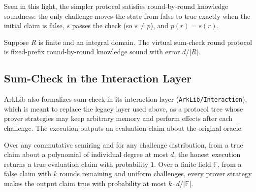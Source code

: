 Seen in this light, the simpler protocol satisfies round-by-round knowledge soundness: the only
challenge moves the state from false to true exactly when the initial claim is false, $s$ passes
the check (so $s \neq p$), and $p(r) = s(r)$.

\begin{theorem}
    Suppose $R$ is finite and an integral domain. The virtual sum-check round protocol is
    fixed-prefix round-by-round knowledge sound with error $d / |R|$.
    \label{thm:virtual_sumcheck_round_protocol_rbr_sound}
    \leanok
\end{theorem}

\subsection{Sum-Check in the Interaction Layer}\label{sec:sumcheck_interaction}

ArkLib also formalizes sum-check in its interaction layer (\texttt{ArkLib/Interaction}), which is
meant to replace the legacy layer used above, as a protocol tree whose
prover strategies may keep arbitrary memory and perform effects after each challenge. The
execution outputs an evaluation claim about the original oracle.

\begin{theorem}
    \label{thm:sumcheck_interaction}
    \leanok
    Over any commutative semiring and for any challenge distribution, from a true claim about a
    polynomial of individual degree at most $d$, the honest execution returns a true
    evaluation claim with probability $1$. Over a finite field $\mathbb{F}$, from a false claim with
    $k$ rounds remaining and uniform challenges, every prover strategy makes the output claim true
    with probability at most $k \cdot d / |\mathbb{F}|$.
\end{theorem}
